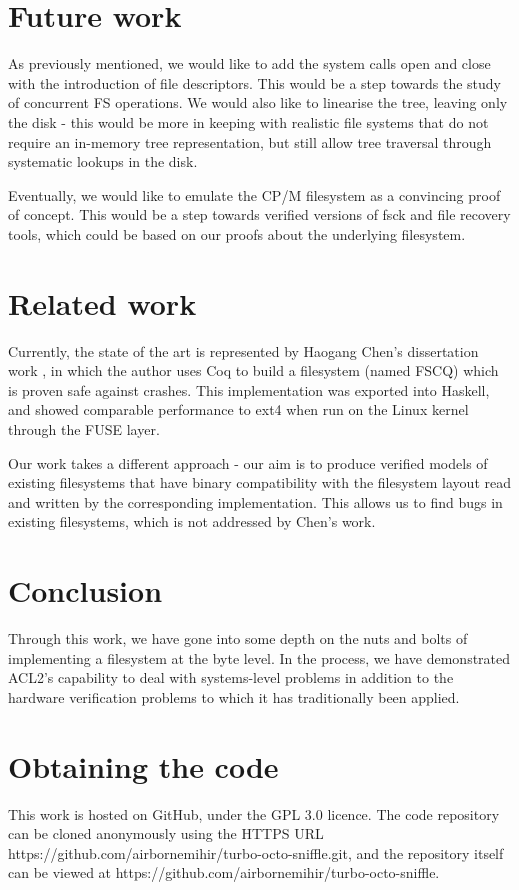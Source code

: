 \documentclass[format=sigconf,review=true]{acmart}
\begin{document}
\section{Future work}
As previously mentioned, we would like to add the system calls open and close with the
introduction of file descriptors. This would be a step towards the
study of concurrent FS operations. We would also like to linearise
the tree, leaving only the disk - this would be more in keeping
with realistic file systems that do not require an in-memory tree
representation, but still allow tree traversal through systematic
lookups in the disk.

Eventually, we would like to emulate the CP/M filesystem as a convincing proof
of concept. This would be a step towards verified versions of fsck
and file recovery tools, which could be based on our proofs about
the underlying filesystem.

\section{Related work}
Currently, the state of the art is represented by Haogang
Chen's dissertation work \cite{DBLP:conf/usenix/ChenZCCKZ16}, in which
the author uses Coq to build a filesystem (named FSCQ) which is proven
safe against crashes. This implementation was exported into Haskell,
and showed comparable performance to ext4 when run on the Linux kernel
through the FUSE layer.

Our work takes a different approach - our aim is to produce verified
models of existing filesystems that have binary compatibility with the
filesystem layout read and written by the corresponding
implementation. This allows us to find bugs in existing filesystems,
which is not addressed by Chen's work.

\section{Conclusion}
Through this work, we have gone into some depth on the nuts and bolts
of implementing a filesystem at the byte level. In the process, we
have demonstrated ACL2's capability to deal with systems-level
problems in addition to the hardware verification problems to which
it has traditionally been applied.

\section{Obtaining the code}
This work is hosted on GitHub, under the GPL 3.0 licence. The code
repository can be cloned anonymously using the HTTPS URL
https://github.com/airbornemihir/turbo-octo-sniffle.git, and the
repository itself can be viewed at
https://github.com/airbornemihir/turbo-octo-sniffle.



\end{document}
